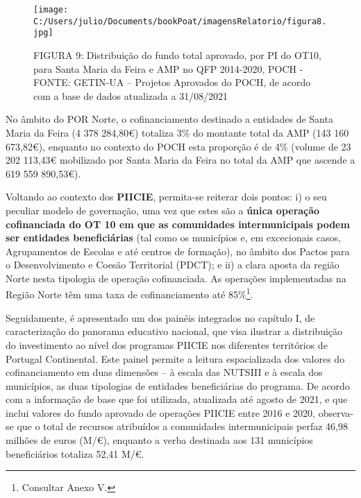 \documentclass[
]{book}
\begin{document}
\begin{figure}
\centering
\texttt{[image: C:/Users/julio/Documents/bookPoat/imagensRelatorio/figura8.jpg]}
\caption{FIGURA 9: Distribuição do fundo total aprovado, por PI do OT10, para Santa Maria da Feira e AMP no QFP 2014-2020, POCH - FONTE: GETIN-UA -- Projetos Aprovados do POCH, de acordo com a base de dados atualizada a 31/08/2021}
\end{figure}

No âmbito do POR Norte, o cofinanciamento destinado a entidades de Santa Maria da Feira (4 378 284,80€) totaliza 3\% do montante total da AMP (143 160 673,82€), enquanto no contexto do POCH esta proporção é de 4\% (volume de 23 202 113,43€ mobilizado por Santa Maria da Feira no total da AMP que ascende a 619 559 890,53€).

Voltando ao contexto dos \textbf{PIICIE}, permita-se reiterar dois pontos: i) o seu peculiar modelo de governação, uma vez que estes são a \textbf{única operação cofinanciada do OT 10 em que as comunidades intermunicipais podem ser entidades beneficiárias} (tal como os municípios e, em excecionais casos, Agrupamentos de Escolas e até centros de formação), no âmbito dos Pactos para o Desenvolvimento e Coesão Territorial (PDCT); e ii) a clara aposta da região Norte nesta tipologia de operação cofinanciada. As operações implementadas na Região Norte têm uma taxa de cofinanciamento até 85\%\footnote{Consultar Anexo V.}.

Seguidamente, é apresentado um dos painéis integrados no capítulo I, de caracterização do panorama educativo nacional, que visa ilustrar a distribuição do investimento ao nível dos programas PIICIE nos diferentes territórios de Portugal Continental. Este painel permite a leitura espacializada dos valores do cofinanciamento em duas dimensões -- à escala das NUTSIII e à escala dos municípios, as duas tipologias de entidades beneficiárias do programa. De acordo com a informação de base que foi utilizada, atualizada até agosto de 2021, e que inclui valores do fundo aprovado de operações PIICIE entre 2016 e 2020, observa-se que o total de recursos atribuídos a comunidades intermunicipais perfaz 46,98 milhões de euros (M/€), enquanto a verba destinada aos 131 municípios beneficiários totaliza 52,41 M/€.
\end{document}

